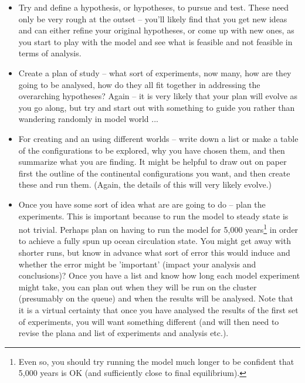 \vspace{2mm}
\begin{itemize}[noitemsep]
\vspace{1mm}
\item Try and define a hypothesis, or hypotheses, to pursue and test. These need only be very rough at the outset -- you'll likely find that you get new ideas and can either refine your original hypotheses, or come up with new ones, as you start to play with the model and see what is feasible and not feasible in terms of analysis.
\vspace{1mm}
\item Create a plan of study -- what sort of experiments, now many, how are they going to be analysed, how do they all fit together in addressing the overarching hypotheses? Again -- it is very likely that your plan will evolve as you go along, but try and start out with something to guide you rather than wandering randomly in model world ...
\vspace{1mm}
\item For creating and an using different worlds -- write down a list or make a table of the configurations to be explored, why you have chosen them, and then summarize what you are finding. It might be helpful to draw out on paper first the outline of the continental configurations you want, and then create these and run them. (Again, the details of this will very likely evolve.)
\vspace{1mm}
\item Once you have some sort of idea what are are going to do -- plan the experiments. This is important because to run the model to steady state is not trivial. Perhaps plan on having to run the model for 5,000 years\footnote{Even so, you should try running the model much longer to be confident that 5,000 years is OK (and sufficiently close to final equilibrium).} in order to achieve a fully spun up ocean circulation state. You might get away with shorter runs, but know in advance what sort of error this would induce and whether the error might be 'important' (impact your analysis and conclusions)? Once you have a list and know how long each model experiment might take, you can plan out when they will be run on the cluster (presumably on the queue) and when the results will be analysed. Note that it is a virtual certainty that once you have analysed the results of the first set of experiments, you will want something different (and will then need to revise the plana and list of experiments and analysis etc.).
\end{itemize}
\vspace{2mm}

